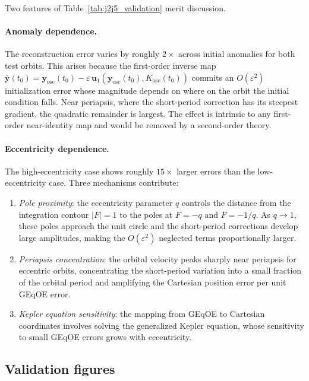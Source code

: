 \documentclass[11pt]{article}
\begin{document}
Two features of Table~\ref{tab:j2j5_validation} merit discussion.

\paragraph{Anomaly dependence.}
The reconstruction error varies by roughly $2\times$ across initial anomalies
for both test orbits. This arises because the first-order inverse map
$\bar{\bm{y}}(t_0) = \bm{y}_{\mathrm{osc}}(t_0)
- \varepsilon\,\bm{u}_1(\bm{y}_{\mathrm{osc}}(t_0),K_{\mathrm{osc}}(t_0))$
commits an $O(\varepsilon^2)$ initialization error whose magnitude depends on
where on the orbit the initial condition falls. Near periapsis, where the
short-period correction has its steepest gradient, the quadratic remainder is
largest. The effect is intrinsic to any first-order near-identity map and
would be removed by a second-order theory.

\paragraph{Eccentricity dependence.}
The high-eccentricity case shows roughly $15\times$ larger errors than the
low-eccentricity case. Three mechanisms contribute:
\begin{enumerate}
    \item \emph{Pole proximity}: the eccentricity parameter $q$ controls the
    distance from the integration contour $|F| = 1$ to the poles at
    $F = -q$ and $F = -1/q$. As $q \to 1$, these poles approach the unit
    circle and the short-period corrections develop large amplitudes,
    making the $O(\varepsilon^2)$ neglected terms proportionally larger.
    \item \emph{Periapsis concentration}: the orbital velocity peaks sharply
    near periapsis for eccentric orbits, concentrating the short-period
    variation into a small fraction of the orbital period and amplifying
    the Cartesian position error per unit GEqOE error.
    \item \emph{Kepler equation sensitivity}: the mapping from GEqOE to
    Cartesian coordinates involves solving the generalized Kepler equation,
    whose sensitivity to small GEqOE errors grows with eccentricity.
\end{enumerate}

\subsection{Validation figures}
\end{document}
